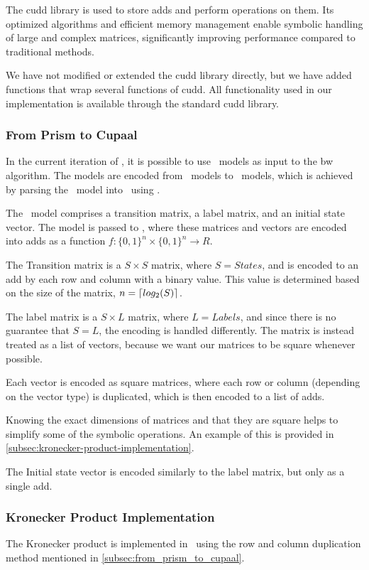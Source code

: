 The \gls{cudd} library is used to store \glspl{add} and perform operations on them.
Its optimized algorithms and efficient memory management enable symbolic handling of large and complex matrices, significantly improving performance compared to traditional methods.

We have not modified or extended the \gls{cudd} library directly, but we have added functions that wrap several functions of \gls{cudd}.
All functionality used in our implementation is available through the standard \gls{cudd} library.

\subsubsection{From Prism to Cupaal}\label{subsec:from_prism_to_cupaal}
In the current iteration of \Cupaal, it is possible to use \Prism\ models as input to the \gls{bw} algorithm. The models are encoded from \Prism\ models to \Cupaal\ models, which is achieved by parsing the \Prism\ model into \Jajapy\ using \Stormpy.

The \Jajapy\ model comprises a transition matrix, a label matrix, and an initial state vector.
The model is passed to \Cupaal, where these matrices and vectors are encoded into \glspl{add} as a function $f \colon \{0,1\}^n \times \{0,1\}^n \to R$.

The Transition matrix is a $S\times S$ matrix, where $S=States$, and is encoded to an \gls{add} by each row and column with a binary value. This value is determined based on the size of the matrix,
$n = \left\lceil log_2(S) \right\rceil$.

The label matrix is a $S\times L$ matrix, where $L=Labels$, and since there is no guarantee that $S = L$, the encoding is handled differently.
The matrix is instead treated as a list of vectors, because we want our matrices to be square whenever possible.

Each vector is encoded as square matrices, where each row or column (depending on the vector type) is duplicated, which is then encoded to a list of \glspl{add}.

Knowing the exact dimensions of matrices and that they are square helps to simplify some of the symbolic operations.
An example of this is provided in \autoref{subsec:kronecker-product-implementation}.

The Initial state vector is encoded similarly to the label matrix, but only as a single \gls{add}.

\subsubsection{Kronecker Product Implementation}\label{subsec:kronecker-product-implementation}
The Kronecker product is implemented in \Cupaal\ using the row and column duplication method mentioned in \autoref{subsec:from_prism_to_cupaal}.

